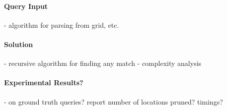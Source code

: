 \paragraph{Query Input}
- algorithm for parsing from grid, etc.

\paragraph{Solution}
- recursive algorithm for finding any match
- complexity analysis

\paragraph{Experimental Results?}
- on ground truth queries? report number of locations pruned? timings?





